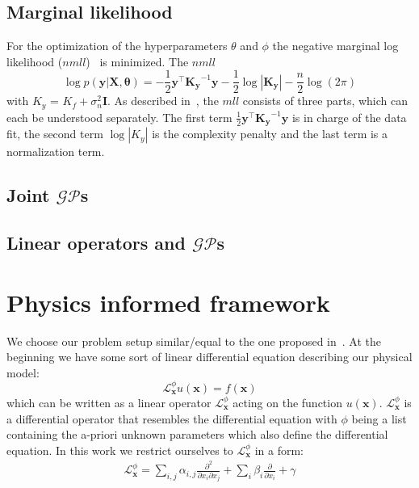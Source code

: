 \documentclass{article}
\begin{document}
\subsection{Marginal likelihood}

For the optimization of the hyperparameters $\theta$ and $\phi$ the negative
marginal log likelihood ($nmll$)~\cite{RasmussenCarlEdward} is minimized. The
$nmll$
\begin{equation}
    \label{eq:nmll}
    \log p(\bm{y}|\bm{X},\bm{\theta}) = -\frac{1}{2}\bm{y}^\intercal \bm{K_y}^{-1}\bm{y} - \frac{1}{2}\log\left\lvert \bm{K_y}\right\rvert - \frac{n}{2}\log(2\pi)
\end{equation}
with $K_y$ = $K_f + \sigma_n^2 \bm{I}$. As described in~\cite{RasmussenCarlEdward}, the $mll$ consists of three parts, which can each be understood separately. The first term $\frac{1}{2}\bm{y}^\intercal \bm{K_y}^{-1}\bm{y}$ is in charge of the data fit, the second term $\log\left\lvert K_y\right\rvert$ is the complexity penalty and the last term is a normalization term.

\subsection{Joint $\mathcal{GP}$s}

\subsection{Linear operators and $\mathcal{GP}$s}

\section{Physics informed framework}
We choose our problem setup similar/equal to the one proposed in~\cite{RAISSI}. At the beginning we  have some sort of linear differential equation describing our physical model:
\begin{equation}
    \label{eq:Lu=f}
    \mathcal{L}_{\bm{x}}^\phi u(\bm{x}) = f(\bm{x})
\end{equation}
which can be written as a linear operator $\mathcal{L}_{\bm{x}}^\phi$ acting on the function $u(\bm{x})$. $\mathcal{L}_{\bm{x}}^\phi$ is a differential operator that resembles the differential equation with $\phi$ being a list containing the a-priori unknown parameters which also define the differential equation. In this work we restrict ourselves to $\mathcal{L}_{\bm{x}}^\phi$ in a form:
\begin{align}
\mathcal{L}_{\bm{x}}^\phi = \sum_{i,j} \alpha_{i,j} \frac{\partial^2 }{\partial x_i \partial x_j} + \sum_{i} \beta_i \frac{\partial}{\partial x_i} + \gamma 
\end{align}
\end{document}
